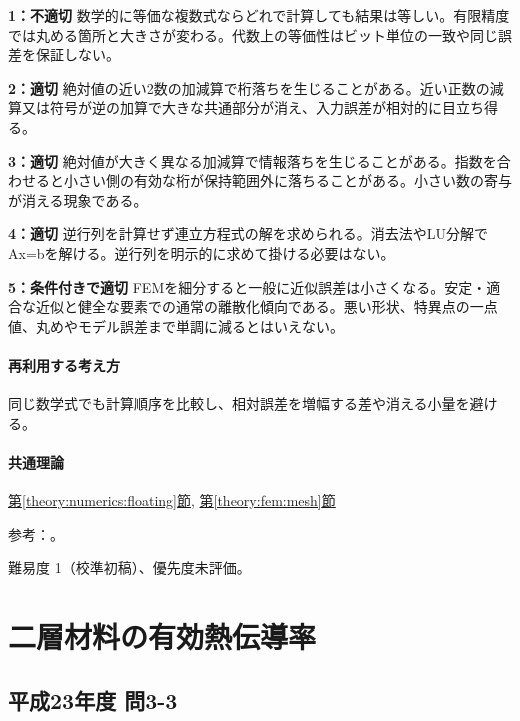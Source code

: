 \noindent\textbf{1：不適切} 数学的に等価な複数式ならどれで計算しても結果は等しい。有限精度では丸める箇所と大きさが変わる。代数上の等価性はビット単位の一致や同じ誤差を保証しない。\par

\noindent\textbf{2：適切} 絶対値の近い2数の加減算で桁落ちを生じることがある。近い正数の減算又は符号が逆の加算で大きな共通部分が消え、入力誤差が相対的に目立ち得る。\par

\noindent\textbf{3：適切} 絶対値が大きく異なる加減算で情報落ちを生じることがある。指数を合わせると小さい側の有効な桁が保持範囲外に落ちることがある。小さい数の寄与が消える現象である。\par

\noindent\textbf{4：適切} 逆行列を計算せず連立方程式の解を求められる。消去法やLU分解でAx=\allowbreak{}bを解ける。逆行列を明示的に求めて掛ける必要はない。\par

\noindent\textbf{5：条件付きで適切} FEMを細分すると一般に近似誤差は小さくなる。安定・適合な近似と健全な要素での通常の離散化傾向である。悪い形状、特異点の一点値、丸めやモデル誤差まで単調に減るとはいえない。\par

\paragraph{再利用する考え方} 同じ数学式でも計算順序を比較し、相対誤差を増幅する差や消える小量を避ける。

\paragraph{共通理論} \hyperref[theory:numerics:floating]{第\ref*{theory:numerics:floating}節}, \hyperref[theory:fem:mesh]{第\ref*{theory:fem:mesh}節}

\par 参考：\cite{goldberg1991,mit_roy_fea1999}。

\par 難易度 1（校準初稿）、優先度未評価。

\section{二層材料の有効熱伝導率}

\subsection{平成23年度 問3-3}
\label{q:h23-reg-basic-3-3}


